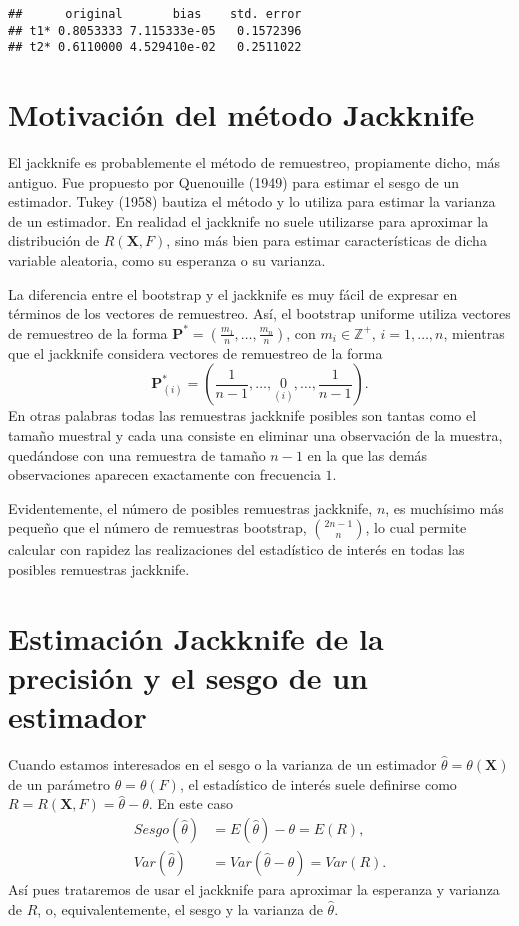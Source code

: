 \documentclass[]{book}
\theoremstyle{break}
\theoremstyle{definition}
\theoremstyle{definition}
\theoremstyle{definition}
\theoremstyle{remark}
\begin{document}
\begin{verbatim}
##      original       bias    std. error
## t1* 0.8053333 7.115333e-05   0.1572396
## t2* 0.6110000 4.529410e-02   0.2511022
\end{verbatim}

\section{Motivación del método Jackknife}\label{jackknife}

El jackknife es probablemente el método de remuestreo, propiamente
dicho, más antiguo. Fue propuesto por Quenouille (1949) para estimar el
sesgo de un estimador. Tukey (1958) bautiza el método y lo utiliza para
estimar la varianza de un estimador. En realidad el jackknife no suele
utilizarse para aproximar la distribución de
\(R\left( \mathbf{X},F \right)\), sino más bien para estimar
características de dicha variable aleatoria, como su esperanza o su
varianza.

La diferencia entre el bootstrap y el jackknife es muy fácil de expresar
en términos de los vectores de remuestreo. Así, el bootstrap uniforme
utiliza vectores de remuestreo de la forma
\(\mathbf{P}^{\ast}=\left( \frac{m_1}{n},\ldots ,\frac{m_n}{n} \right)\),
con \(m_i\in \mathbb{Z}^{+}\), \(i=1,\ldots ,n\), mientras que el
jackknife considera vectores de remuestreo de la forma
\[\mathbf{P}_{(i)}^{\ast}=\left( \frac{1}{n-1},\ldots ,\underset{(i)}{0}
,\ldots ,\frac{1}{n-1} \right).\] En otras palabras todas las remuestras
jackknife posibles son tantas como el tamaño muestral y cada una
consiste en eliminar una observación de la muestra, quedándose con una
remuestra de tamaño \(n-1\) en la que las demás observaciones aparecen
exactamente con frecuencia \(1\).

Evidentemente, el número de posibles remuestras jackknife, \(n\), es
muchísimo más pequeño que el número de remuestras bootstrap,
\(\binom{2n-1}{n}\), lo cual permite calcular con rapidez las
realizaciones del estadístico de interés en todas las posibles
remuestras jackknife.

\section{Estimación Jackknife de la precisión y el sesgo de un
estimador}\label{estimaciuxf3n-jackknife-de-la-precisiuxf3n-y-el-sesgo-de-un-estimador}

Cuando estamos interesados en el sesgo o la varianza de un estimador
\(\hat{\theta}=\theta \left( \mathbf{X} \right)\) de un parámetro
\(\theta =\theta \left( F \right)\), el estadístico de interés suele
definirse como \(R=R\left( \mathbf{X},F \right) =\hat{\theta}-\theta\).
En este caso \[\begin{aligned}
Sesgo\left( \hat{\theta} \right) &= E\left( \hat{\theta} \right) -\theta
=E\left( R \right), \\
Var\left( \hat{\theta} \right) &= Var\left( \hat{\theta}-\theta \right)
=Var\left( R \right).
\end{aligned}\] Así pues trataremos de usar el jackknife para aproximar
la esperanza y varianza de \(R\), o, equivalentemente, el sesgo y la
varianza de \(\hat{\theta}\).
\end{document}
